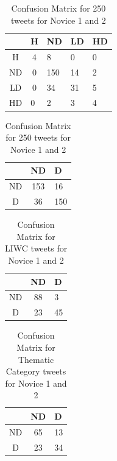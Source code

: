 \documentclass[11pt]{article}
\begin{document}
\begin{table}[h]
\centering
\begin{tabular}{c|c|l|l|l|}
\cline{2-5}
                         & H                       & ND  & LD & HD \\ \hline
\multicolumn{1}{|c|}{H}  & 4                       & 8   & 0  & 0  \\ \hline
\multicolumn{1}{|c|}{ND} & 0                       & 150 & 14 & 2  \\ \hline
\multicolumn{1}{|c|}{LD} & 0                       & 34  & 31 & 5  \\ \hline
\multicolumn{1}{|l}{HD}  & \multicolumn{1}{|l|}{0} & 2   & 3  & 4  \\ \hline
\end{tabular}
\caption {Confusion Matrix for 250 tweets for Novice 1 and 2}
\end{table}


\begin{table}[h]
\centering
\begin{tabular}{c|c|l|}
\cline{2-3}
                         & ND  & D   \\ \hline
\multicolumn{1}{|c|}{ND} & 153 & 16  \\ \hline
\multicolumn{1}{|c|}{D}  & 36  & 150 \\ \hline
\end{tabular}
\caption {Confusion Matrix for 250 tweets for Novice 1 and 2}
\end{table}


\begin{table}[h]
\centering
\begin{tabular}{c|c|l|}
\cline{2-3}
                         & ND & D  \\ \hline
\multicolumn{1}{|c|}{ND} & 88 & 3  \\ \hline
\multicolumn{1}{|c|}{D}  & 23 & 45 \\ \hline
\end{tabular}
\caption {Confusion Matrix for LIWC tweets for Novice 1 and 2}
\end{table}

\begin{table}[h]
\centering
\begin{tabular}{c|c|l|}
\cline{2-3}
                         & ND & D  \\ \hline
\multicolumn{1}{|c|}{ND} & 65 & 13 \\ \hline
\multicolumn{1}{|c|}{D}  & 23 & 34 \\ \hline
\end{tabular}
\caption {Confusion Matrix for Thematic Category tweets for Novice 1 and 2}
\end{table}
\end{document}
